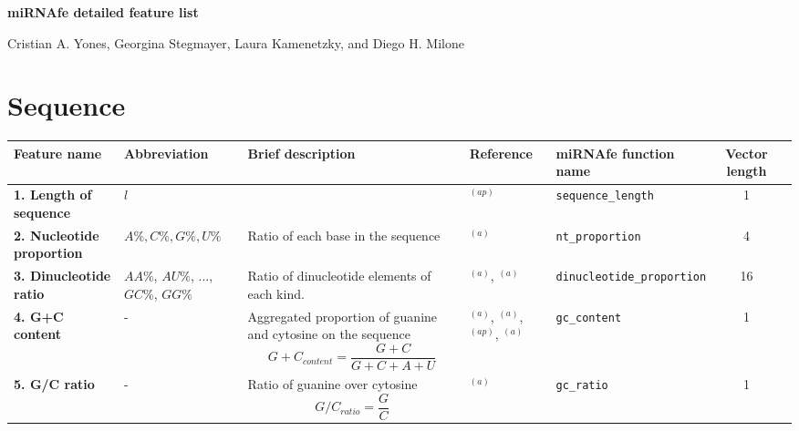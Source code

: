 \documentclass[a4paper,10pt]{article}
\begin{document}
\setcounter{page}{55}

\begin{center}
{\LARGE \textbf{miRNAfe detailed feature list}}

{Cristian A. Yones, Georgina Stegmayer, Laura Kamenetzky, and Diego H. Milone}
\end{center}

\section{Sequence}

\small
\begin{longtable}{ >{\raggedright\arraybackslash}p{4cm}  p{2.2cm}  p{5.4cm}  p{1.6cm}  l  cp{1cm} }
 \toprule
 Feature name & Abbreviation & \centering Brief description & Reference & miRNAfe function name  & Vector length \\
 \midrule
 \endhead
 \bottomrule
 \endlastfoot

\bfseries{1. Length of sequence} & $l$ &  & \cite{MM09}$^{(ap)}$\footnotemark & \verb|sequence_length| & 1\\

\bfseries{2. Nucleotide proportion} & $A\%, C\%, G\%, U\%$ & Ratio of each base in the sequence & \cite{SP05}$^{(a)}$ & \verb|nt_proportion| & 4\\

\bfseries{3. Dinucleotide ratio} & $AA\%$, $AU\%$, $...$, $GC\%$, $GG\%$ & Ratio of dinucleotide elements of each kind. & \cite{RV09}$^{(a)}$, \cite{PM11}$^{(a)}$ & \verb|dinucleotide_proportion| & 16 \\

\bfseries{4. G+C content} & - & Aggregated proportion of guanine and cytosine on the sequence $$ G+C_{content} = {\frac{G + C}{G + C + A + U}} $$ & \cite{HS06}$^{(a)}$, \cite{RV09}$^{(a)}$, \cite{MM09}$^{(ap)}$, \cite{PM11}$^{(a)}$ & \verb|gc_content| & 1\\

\bfseries{5. G/C ratio} & - & Ratio of guanine over cytosine $$ G/C_{ratio} = {\frac{G}{C}} $$ & \cite{JS10}$^{(a)}$ & \verb|gc_ratio| & 1 \\

\end{longtable}


\newpage
\end{document}
